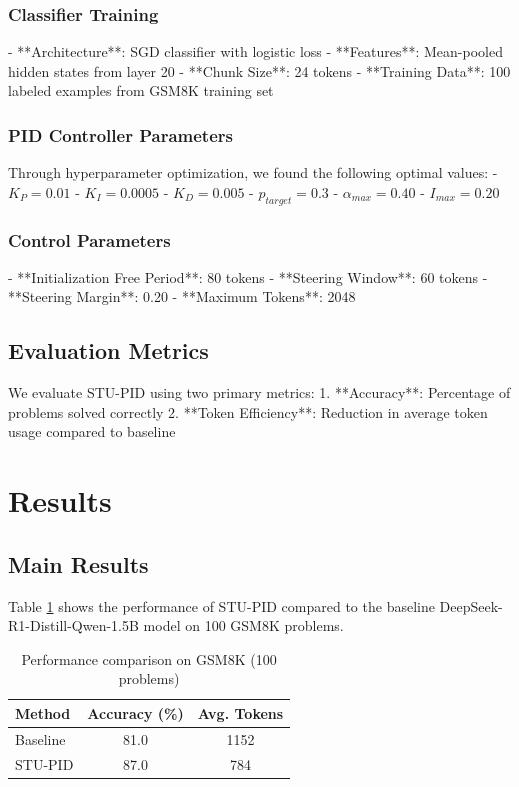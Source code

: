 \documentclass{article}
\begin{document}
\subsubsection{Classifier Training}
- **Architecture**: SGD classifier with logistic loss
- **Features**: Mean-pooled hidden states from layer 20
- **Chunk Size**: 24 tokens
- **Training Data**: 100 labeled examples from GSM8K training set

\subsubsection{PID Controller Parameters}
Through hyperparameter optimization, we found the following optimal values:
- $K_P = 0.01$
- $K_I = 0.0005$ 
- $K_D = 0.005$
- $p_{target} = 0.3$
- $\alpha_{max} = 0.40$
- $I_{max} = 0.20$

\subsubsection{Control Parameters}
- **Initialization Free Period**: 80 tokens
- **Steering Window**: 60 tokens
- **Steering Margin**: 0.20
- **Maximum Tokens**: 2048

\subsection{Evaluation Metrics}

We evaluate STU-PID using two primary metrics:
1. **Accuracy**: Percentage of problems solved correctly
2. **Token Efficiency**: Reduction in average token usage compared to baseline

\section{Results}

\subsection{Main Results}

Table \ref{tab:main_results} shows the performance of STU-PID compared to the baseline DeepSeek-R1-Distill-Qwen-1.5B model on 100 GSM8K problems.

\begin{table}[h]
\centering
\caption{Performance comparison on GSM8K (100 problems)}
\label{tab:main_results}
\begin{tabular}{lcc}
\toprule
Method & Accuracy (\%) & Avg. Tokens \\
\midrule
Baseline & 81.0 & 1152 \\
STU-PID & 87.0 & 784 \\
\bottomrule
\end{tabular}
\end{table}
\end{document}
